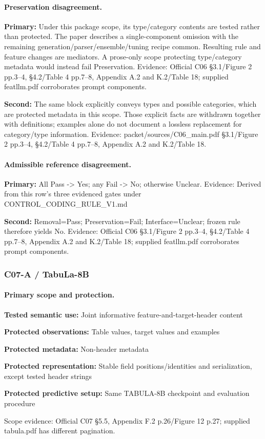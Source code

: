 \documentclass[10pt]{article}
\begin{document}
\paragraph{Preservation disagreement.}
\textbf{Primary:} Under this package scope, its type/category contents are tested rather than protected. The paper describes a single-component omission with the remaining generation/parser/ensemble/tuning recipe common. Resulting rule and feature changes are mediators. A prose-only scope protecting type/category metadata would instead fail Preservation. Evidence: Official C06 §3.1/Figure 2 pp.3--4, §4.2/Table 4 pp.7--8, Appendix A.2 and K.2/Table 18; supplied featllm.pdf corroborates prompt components.\par
\textbf{Second:} The same block explicitly conveys types and possible categories, which are protected metadata in this scope. Those explicit facts are withdrawn together with definitions; examples alone do not document a lossless replacement for category/type information. Evidence: packet/sources/C06\_main.pdf §3.1/Figure 2 pp.3--4, §4.2/Table 4 pp.7--8, Appendix A.2 and K.2/Table 18.\par
\paragraph{Admissible reference disagreement.}
\textbf{Primary:} All Pass -> Yes; any Fail -> No; otherwise Unclear. Evidence: Derived from this row’s three evidenced gates under CONTROL\_CODING\_RULE\_V1.md\par
\textbf{Second:} Removal=Pass; Preservation=Fail; Interface=Unclear; frozen rule therefore yields No. Evidence: Official C06 §3.1/Figure 2 pp.3--4, §4.2/Table 4 pp.7--8, Appendix A.2 and K.2/Table 18; supplied featllm.pdf corroborates prompt components.\par
\subsubsection*{C07-A / TabuLa-8B}
\paragraph{Primary scope and protection.}
\textbf{Tested semantic use:} Joint informative feature-and-target-header content\par
\textbf{Protected observations:} Table values, target values and examples\par
\textbf{Protected metadata:} Non-header metadata\par
\textbf{Protected representation:} Stable field positions/identities and serialization, except tested header strings\par
\textbf{Protected predictive setup:} Same TABULA-8B checkpoint and evaluation procedure\par
Scope evidence: Official C07 §5.5, Appendix F.2 p.26/Figure 12 p.27; supplied tabula.pdf has different pagination.\par
\end{document}
